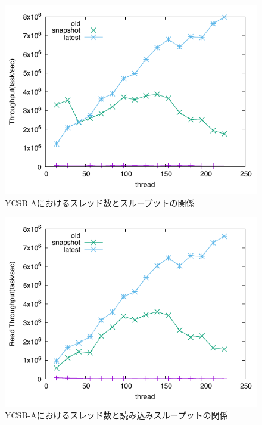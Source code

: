 \documentclass[a4paper]{jreport}	%
\begin{document}
\begin{figure}[h] 
\centering
\includegraphics[width=15cm]{ycsb-a/opposite-throughput}
\caption{YCSB-Aにおけるスレッド数とスループットの関係}
\label{fig:a-throughput}
\end{figure}


\begin{figure}[h] 
\centering
\includegraphics[width=15cm]{ycsb-a/opposite-read-throughput}
\caption{YCSB-Aにおけるスレッド数と読み込みスループットの関係}
\label{fig:a-throughput-read}
\end{figure}
\end{document}
